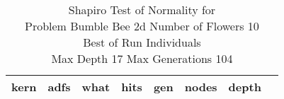 \begin{table}[H]
\caption{Shapiro Test of Normality for \\ Problem  Bumble Bee 2d  Number of Flowers 10\\Best of Run Individuals \\ Max Depth 17 Max Generations 104\\}
\begin{center}
\scalebox{0.8} %
{
\begin{tabular}{lrrrrrrr}
\hline
kern & adfs & what & hits & gen & nodes & depth \\
\hline


\end{tabular}
}
\end{center}
\end{table}

